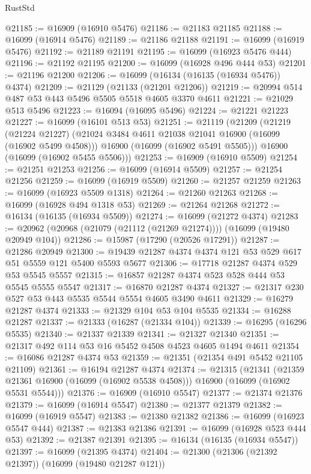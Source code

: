 \begin{lexlean}{RustStd}
\begin{coremodule}
@21185 := @16909 (@16910 @5476)
@21186 := @21183 @21185
@21188 := @16099 (@16914 @5476)
@21189 := @21186 @21188
@21191 := @16099 (@16919 @5476)
@21192 := @21189 @21191
@21195 := @16099 (@16923 @5476 @444)
@21196 := @21192 @21195
@21200 := @16099 (@16928 @496 @444 @53)
@21201 := @21196 @21200
@21206 := @16099 (@16134 (@16135 (@16934 @5476)) @4374)
@21209 := @21129 (@21133 (@21201 @21206))
@21219 := @20994 @514 @487 @53 @443 @5496 @5505 @5518 @4605 @3370 @4611
@21221 := @21029 @513 @5496
@21223 := @16094 (@16095 @5496)
@21224 := @21221 @21223
@21227 := @16099 (@16101 @513 @53)
@21251 := @21119
    (@21209
      (@21219
        (@21224 @21227)
        (@21024 @3484 @4611 @21038 @21041 @16900 (@16099 (@16902 @5499 @4508)))
        @16900
        (@16099 (@16902 @5491 @5505)))
      @16900
      (@16099 (@16902 @5455 @5506)))
@21253 := @16909 (@16910 @5509)
@21254 := @21251 @21253
@21256 := @16099 (@16914 @5509)
@21257 := @21254 @21256
@21259 := @16099 (@16919 @5509)
@21260 := @21257 @21259
@21263 := @16099 (@16923 @5509 @1318)
@21264 := @21260 @21263
@21268 := @16099 (@16928 @494 @1318 @53)
@21269 := @21264 @21268
@21272 := @16134 (@16135 (@16934 @5509))
@21274 := @16099 (@21272 @4374)
@21283 := @20962 (@20968 (@21079 (@21112 (@21269 @21274)))) (@16099 (@19480 @20949 @104))
@21286 := @15987 (@17290 (@20526 @17291))
@21287 := @21286 @20949
@21300 := @19439 @21287 @4374 @4374 @121 @53 @529 @617 @51 @5559 @121 @5400 @5593 @5677
@21306 := @17718 @21287 @4374 @529 @53 @5545 @5557
@21315 := @16857 @21287 @4374 @523 @528 @444 @53 @5545 @5555 @5547
@21317 := @16870 @21287 @4374
@21327 := @21317 @230 @527 @53 @443 @5535 @5544 @5554 @4605 @3490 @4611
@21329 := @16279 @21287 @4374
@21333 := @21329 @104 @53 @104 @5535
@21334 := @16288 @21287
@21337 := @21333 (@16287 (@21334 @104))
@21339 := @16295 (@16296 @5535)
@21340 := @21337 @21339
@21341 := @21327 @21340
@21351 := @21317 @492 @114 @53 @16 @5452 @4508 @4523 @4605 @1494 @4611
@21354 := @16086 @21287 @4374 @53
@21359 := @21351 (@21354 @491 @5452 @21105 @21109)
@21361 := @16194 @21287 @4374
@21374 := @21315
    (@21341
      (@21359 @21361 @16900 (@16099 (@16902 @5538 @4508)))
      @16900
      (@16099 (@16902 @5531 @5544)))
@21376 := @16909 (@16910 @5547)
@21377 := @21374 @21376
@21379 := @16099 (@16914 @5547)
@21380 := @21377 @21379
@21382 := @16099 (@16919 @5547)
@21383 := @21380 @21382
@21386 := @16099 (@16923 @5547 @444)
@21387 := @21383 @21386
@21391 := @16099 (@16928 @523 @444 @53)
@21392 := @21387 @21391
@21395 := @16134 (@16135 (@16934 @5547))
@21397 := @16099 (@21395 @4374)
@21404 := @21300 (@21306 (@21392 @21397)) (@16099 (@19480 @21287 @121))

\end{coremodule}
\end{lexlean}
